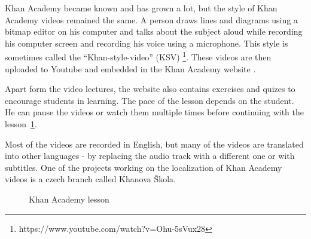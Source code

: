 Khan Academy became known and has grown a lot, but the style of Khan Academy videos remained the same. A person draws lines and diagrams using a bitmap editor on his computer and talks about the subject aloud while recording his computer screen and recording his voice using a microphone. This style is sometimes called the ``Khan-style-video'' (KSV) \footnote{https://www.youtube.com/watch?v=Ohu-5sVux28}. These videos are then uploaded to Youtube and embedded in the Khan Academy website \cite{14}.

Apart form the video lectures, the website also contains exercises and quizes to encourage students in learning. The pace of the lesson depends on the student. He can pause the videos or watch them multiple times before continuing with the lesson~\ref{fig:khan-screen}.

Most of the videos are recorded in English, but many of the videos are translated into other languages - by replacing the audio track with a different one or with subtitles. One of the projects working on the localization of Khan Academy videos is a czech branch called Khanova Škola\cite{15}.

\begin{figure}
	\centering
	\caption{Khan Academy lesson}
	\label{fig:khan-screen}
\end{figure}